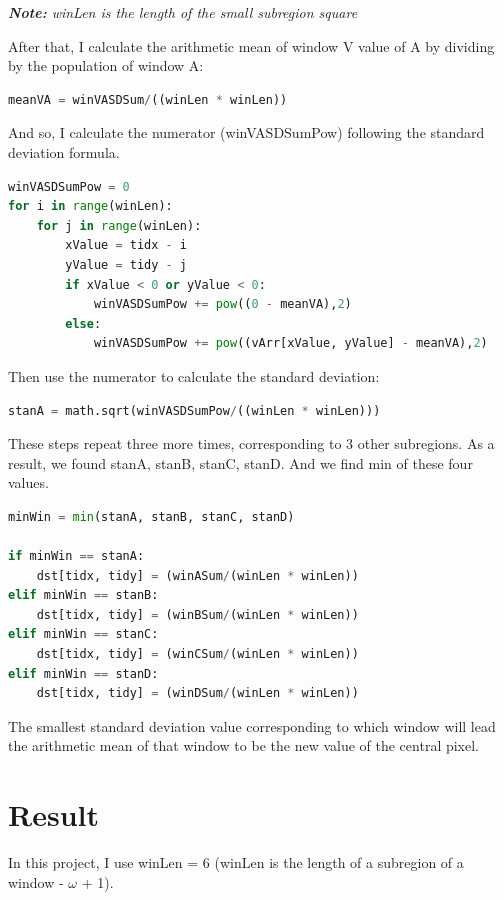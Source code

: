 \documentclass{article}
\begin{document}
\textit{\textbf{Note:} winLen is the length of the small subregion square}

After that, I calculate the arithmetic mean of window V value of A by dividing by the population of window A:

\begin{lstlisting}[language=Python]
meanVA = winVASDSum/((winLen * winLen))
\end{lstlisting}

And so, I calculate the numerator (winVASDSumPow) following the standard deviation formula.

\begin{lstlisting}[language=Python]
winVASDSumPow = 0
for i in range(winLen):
    for j in range(winLen):
        xValue = tidx - i
        yValue = tidy - j
        if xValue < 0 or yValue < 0:
            winVASDSumPow += pow((0 - meanVA),2)
        else:
            winVASDSumPow += pow((vArr[xValue, yValue] - meanVA),2)
\end{lstlisting}

Then use the numerator to calculate the standard deviation:


\begin{lstlisting}[language=Python]
stanA = math.sqrt(winVASDSumPow/((winLen * winLen)))
\end{lstlisting}

These steps repeat three more times, corresponding to 3 other subregions. As a result, we found stanA, stanB, stanC, stanD. And we find min of these four values. 

\begin{lstlisting}[language=Python]
minWin = min(stanA, stanB, stanC, stanD)

if minWin == stanA:
    dst[tidx, tidy] = (winASum/(winLen * winLen))
elif minWin == stanB:
    dst[tidx, tidy] = (winBSum/(winLen * winLen))
elif minWin == stanC:
    dst[tidx, tidy] = (winCSum/(winLen * winLen))
elif minWin == stanD:
    dst[tidx, tidy] = (winDSum/(winLen * winLen))
\end{lstlisting}

The smallest standard deviation value corresponding to which window will lead the arithmetic mean of that window to be the new value of the central pixel.

\section{Result}
In this project, I use winLen = 6 (winLen is the length of a subregion of a window - $\omega$ + 1). 
\end{document}
